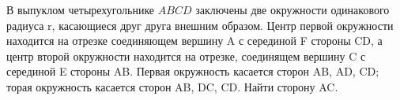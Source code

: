 \documentclass[preview]{standalone}
\begin{document}
В выпуклом четырехугольнике $ABCD$ заключены две окружности одинакового радиуса r, 
                          касающиеся друг друга внешним образом. Центр первой окружности находится на отрезке 
                          соединяющем вершину A с серединой F стороны CD, а центр второй окружности находится 
                          на отрезке, соединящем вершину C с серединой E стороны AB. Первая окружность касается 
                          сторон AB, AD, CD; торая окружность касается сторон AB, DC, CD. Найти сторону AC.
\end{document}

